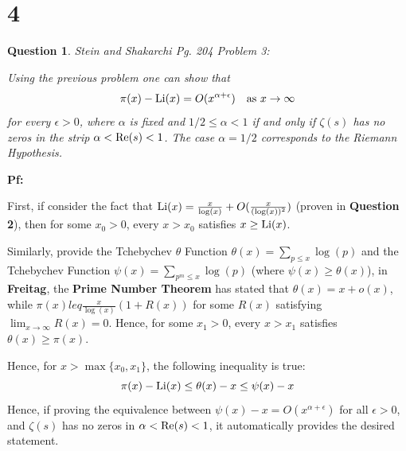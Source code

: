 \documentclass{article}
\newtheorem{question}{Question}
\begin{document}
\section*{4}
\begin{myBox}[]{}
    \begin{question}
        Stein and Shakarchi Pg. 204 Problem 3:

        Using the previous problem one can show that 
        $$\pi(x)-\textmd{Li}(x)=O(x^{\alpha+\epsilon})\quad \textmd{as }x\rightarrow\infty$$
        for every $\epsilon>0$, where $\alpha$ is fixed and $1/2\leq \alpha<1$ if and only if $\zeta(s)$ has no zeros in the strip $\alpha<\textmd{Re}(s)<1$. The case $\alpha=1/2$ corresponds to the Riemann Hypothesis.     
    \end{question}
\end{myBox}

\textbf{Pf:}

First, if consider the fact that $\textmd{Li}(x)=\frac{x}{\log(x)}+O(\frac{x}{(\log(x))^2})$ (proven in \textbf{Question 2}), then for some $x_0>0$, every $x>x_0$ satisfies $x\geq \textmd{Li}(x)$.

Similarly, provide the Tchebychev $\theta$ Function $\theta(x)=\sum_{p\leq x}\log(p)$ and the Tchebychev Function $\psi(x)=\sum_{p^m\leq x}\log(p)$ (where $\psi(x)\geq \theta(x)$), in \textbf{Freitag}, the \textbf{Prime Number Theorem} has stated that $\theta(x)=x+o(x)$, while $\pi(x) leq \frac{x}{\log(x)}(1+R(x))$ for some $R(x)$ satisfying $\lim_{x\rightarrow\infty} R(x)=0$. Hence, for some $x_1>0$, every $x>x_1$ satisfies $\theta(x)\geq \pi(x)$.

Hence, for $x>\max\{x_0,x_1\}$, the following inequality is true:
$$\pi(x)-\textmd{Li}(x)\leq \theta(x)-x \leq \psi(x)-x$$
Hence, if proving the equivalence between $\psi(x)-x=O(x^{\alpha+\epsilon})$ for all $\epsilon>0$, and $\zeta(s)$ has no zeros in $\alpha<\textmd{Re}(s)<1$, it automatically provides the desired statement.
\end{document}
